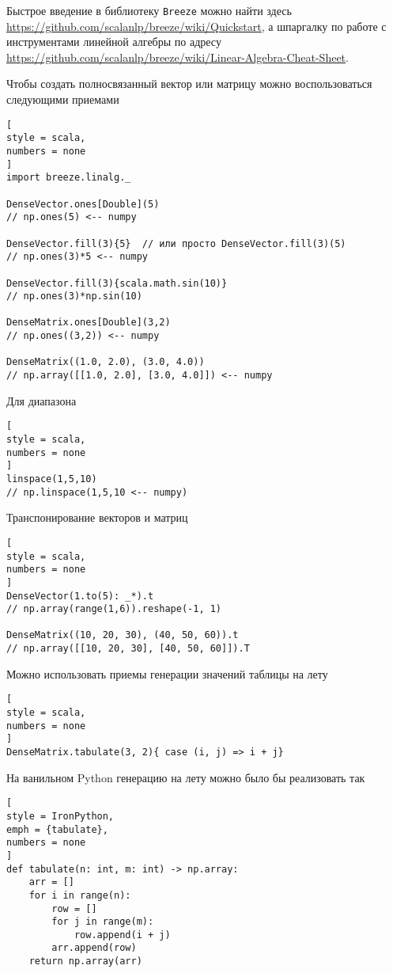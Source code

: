 \documentclass[%
	11pt,
	a4paper,
	utf8,
		]{article}
\begin{document}
Быстрое введение в библиотеку \texttt{Breeze} можно найти здесь \url{https://github.com/scalanlp/breeze/wiki/Quickstart}, а шпаргалку по работе с инструментами линейной алгебры по адресу \url{https://github.com/scalanlp/breeze/wiki/Linear-Algebra-Cheat-Sheet}.

Чтобы создать полносвязанный вектор или матрицу можно воспользоваться следующими приемами
\begin{lstlisting}[
style = scala,
numbers = none	
]
import breeze.linalg._

DenseVector.ones[Double](5) 
// np.ones(5) <-- numpy

DenseVector.fill(3){5}  // или просто DenseVector.fill(3)(5)
// np.ones(3)*5 <-- numpy

DenseVector.fill(3){scala.math.sin(10)}
// np.ones(3)*np.sin(10)

DenseMatrix.ones[Double](3,2)
// np.ones((3,2)) <-- numpy

DenseMatrix((1.0, 2.0), (3.0, 4.0))
// np.array([[1.0, 2.0], [3.0, 4.0]]) <-- numpy
\end{lstlisting}

Для диапазона
\begin{lstlisting}[
style = scala,
numbers = none	
]
linspace(1,5,10)
// np.linspace(1,5,10 <-- numpy)
\end{lstlisting}

Транспонирование векторов и матриц
\begin{lstlisting}[
style = scala,
numbers = none	
]
DenseVector(1.to(5): _*).t
// np.array(range(1,6)).reshape(-1, 1)

DenseMatrix((10, 20, 30), (40, 50, 60)).t
// np.array([[10, 20, 30], [40, 50, 60]]).T
\end{lstlisting}

Можно использовать приемы генерации значений таблицы на лету
\begin{lstlisting}[
style = scala,
numbers = none	
]
DenseMatrix.tabulate(3, 2){ case (i, j) => i + j}
\end{lstlisting}

На ванильном Python генерацию на лету можно было бы реализовать так
\begin{lstlisting}[
style = IronPython,
emph = {tabulate},
numbers = none	
]
def tabulate(n: int, m: int) -> np.array:
    arr = []
    for i in range(n):
        row = []
        for j in range(m):
            row.append(i + j)
        arr.append(row)
    return np.array(arr)
\end{lstlisting}
\end{document}
